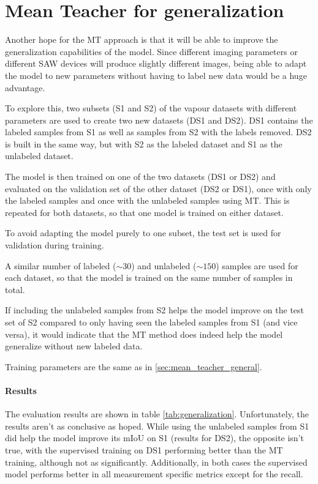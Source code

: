 \section{Mean Teacher for generalization}
\label{sec:generalization}

Another hope for the MT approach is that it will be able to improve the generalization capabilities of the model. Since different imaging parameters or different SAW devices will produce slightly different images, being able to adapt the model to new parameters without having to label new data would be a huge advantage.

To explore this, two subsets (S1 and S2) of the vapour datasets with different parameters are used to create two new datasets (DS1 and DS2). DS1 contains the labeled samples from S1 as well as samples from S2 with the labels removed. DS2 is built in the same way, but with S2 as the labeled dataset and S1 as the unlabeled dataset.

The model is then trained on one of the two datasets (DS1 or DS2) and evaluated on the validation set of the other dataset (DS2 or DS1), once with only the labeled samples and once with the unlabeled samples using MT. This is repeated for both datasets, so that one model is trained on either dataset. 

To avoid adapting the model purely to one subset, the test set is used for validation during training. 

A similar number of labeled ($\sim 30$) and unlabeled ($\sim 150$) samples are used for each dataset, so that the model is trained on the same number of samples in total.

If including the unlabeled samples from S2 helps the model improve on the test set of S2 compared to only having seen the labeled samples from S1 (and vice versa), it would indicate that the MT method does indeed help the model generalize without new labeled data.

Training parameters are the same as in \ref{sec:mean_teacher_general}.

\paragraph{Results}

The evaluation results are shown in table \ref{tab:generalization}. 
Unfortunately, the results aren't as conclusive as hoped. 
While using the unlabeled samples from S1 did help the model improve its mIoU on S1 (results for DS2), the opposite isn't true, with the supervised training on DS1 performing better than the MT training, although not as significantly. 
Additionally, in both cases the supervised model performs better in all measurement specific metrics except for the recall.

